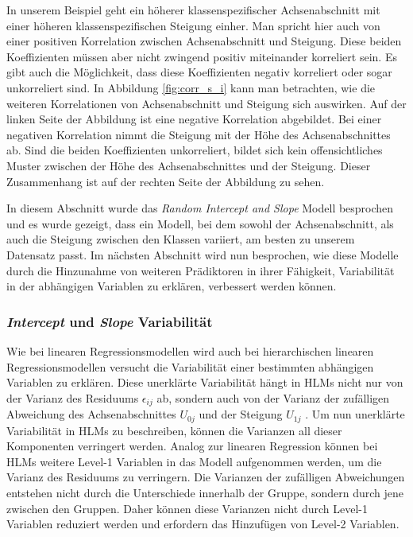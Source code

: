 \documentclass[12pt, a4paper]{article}\usepackage[]{graphicx}\usepackage[]{color}
\begin{document}
In unserem Beispiel geht ein höherer klassenspezifischer Achsenabschnitt mit einer höheren klassenspezifischen Steigung einher. Man spricht hier auch von einer positiven Korrelation zwischen Achsenabschnitt und Steigung. Diese beiden Koeffizienten müssen aber nicht zwingend positiv miteinander korreliert sein. Es gibt auch die Möglichkeit, dass diese Koeffizienten negativ korreliert oder sogar unkorreliert sind. In Abbildung \ref{fig:corr_s_i} kann man betrachten, wie die weiteren Korrelationen von Achsenabschnitt und Steigung sich auswirken. Auf der linken Seite der Abbildung ist eine negative Korrelation abgebildet. Bei einer negativen Korrelation nimmt die Steigung mit der Höhe des Achsenabschnittes ab. Sind die beiden Koeffizienten unkorreliert, bildet sich kein offensichtliches Muster zwischen der Höhe des Achsenabschnittes und der Steigung. Dieser Zusammenhang ist auf der rechten Seite der Abbildung zu sehen.

In diesem Abschnitt wurde das \textit{Random Intercept and Slope} Modell besprochen und es wurde gezeigt, dass ein Modell, bei dem sowohl der Achsenabschnitt, als auch die Steigung zwischen den Klassen variiert, am besten zu unserem Datensatz passt. Im nächsten Abschnitt wird nun besprochen, wie diese Modelle durch die Hinzunahme von weiteren Prädiktoren in ihrer Fähigkeit, Variabilität in der abhängigen Variablen zu erklären, verbessert werden können.

\subsubsection{\textit{Intercept} und \textit{Slope} Variabilität} \label{section:variability}
Wie bei linearen Regressionsmodellen wird auch bei hierarchischen linearen Regressionsmodellen versucht die Variabilität einer bestimmten abhängigen Variablen zu erklären. Diese unerklärte Variabilität hängt in HLMs nicht nur von der Varianz des Residuums $\epsilon_{ij}$ ab, sondern auch von der Varianz der zufälligen Abweichung des Achsenabschnittes $U_{0j}$ und der Steigung $U_{1j}$ \citep{SnijdersTomA.B2012Ma:a}. Um nun unerklärte Variabilität in HLMs zu beschreiben, können die Varianzen all dieser Komponenten verringert werden. Analog zur linearen Regression können bei HLMs weitere Level-1 Variablen in das Modell aufgenommen werden, um die Varianz des Residuums zu verringern. Die Varianzen der zufälligen Abweichungen entstehen nicht durch die Unterschiede innerhalb der Gruppe, sondern durch jene zwischen den Gruppen. Daher können diese Varianzen nicht durch Level-1 Variablen reduziert werden und erfordern das Hinzufügen von Level-2 Variablen. 
\end{document}
